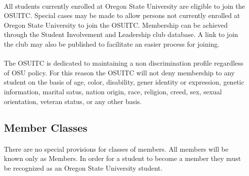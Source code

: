 \documentclass[12pt]{article}
\begin{document}
\paragraph{}
All students currently enrolled at Oregon State University are eligible to join the OSUITC. Special cases may be made to allow persons not currently enrolled at Oregon State University to join the OSUITC. Membership can be achieved through the Student Involvement and Leadership club database. A link to join the club may also be published to facilitate an easier process for joining.

\paragraph{}
The OSUITC is dedicated to maintaining a non discrimination profile regardless of OSU policy. For this reason the OSUITC will not deny membership to any student on the basis of age, color, disability, gener identity or expression, genetic information, marital satus, nation origin, race, religion, creed,  sex, sexual orientation, veteran status, or any other basis. 

\subsection{Member Classes}
\paragraph{}
There are no special provisions for classes of members. All members will be known only as Members. In order for a student to become a member they must be recognized as an Oregon State University student. 



\end{document}
